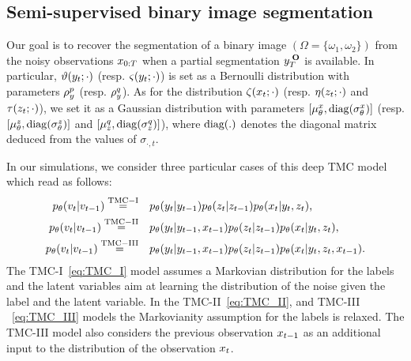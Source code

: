 \subsection{Semi-supervised binary image segmentation}
Our goal is to recover the 
segmentation of a binary image $(\Omega=\{\omega_1,\omega_2\})$
from the noisy observations
$x_{0:T}$ when a partial segmentation $y_{T}^{\;\mathbf{O}}$ is available.
In particular, $\vartheta(y_t; \cdot )$ (resp. $\varsigma(y_t;\cdot)$) 
is set  as a Bernoulli distribution with parameters $\rho_{y}^{p}$ (resp. $\rho_{y}^{q}$). 
As for the distribution  $\zeta(x_t; \cdot )$ 
(resp. $\eta(z_t;\cdot)$ and  $\tau(z_t;\cdot)$), 
we set it as a Gaussian distribution with parameters 
$[ \mu_{\theta}^{x} , \mathrm{diag}(\sigma_{\theta}^{x}) ]$ (resp.  $[ \mu_{\theta}^{z} , \mathrm{diag}(\sigma_{\theta}^{z})]$
 and $[ \mu_{z}^{q} , \mathrm{diag}(\sigma_{z}^{q}) ]$),
where ${\rm diag(.)}$ denotes the diagonal matrix deduced from the values 
of $\sigma_{\cdot,t}$.

In our simulations, we consider three particular cases of this deep TMC model
which read as follows:
\begin{align}
    \label{eq:TMC_I}
    p_{\theta}({v}_t|{v}_{t-1}) \overset{\rm TMC-I}{=}  \quad &
    p_{\theta}(y_t|y_{t-1}) 
    p_{\theta}(z_t|z_{t-1}) 
    p_{\theta}(x_t|y_t,z_t) \text{,}\\
    \label{eq:TMC_II}
    p_{\theta}({v}_t|{v}_{t-1}) \overset{\rm  TMC-II}{=}  \quad &
    p_{\theta}(y_t|y_{t-1}, x_{t-1}) 
    p_{\theta}(z_t|z_{t-1}) 
    p_{\theta}(x_t|y_t,z_t)\text{,} \\
    \label{eq:TMC_III}
    p_{\theta}({v}_t|{v}_{t-1}) \overset{\rm TMC-III}{=}  \quad&
    p_{\theta}(y_t|y_{t-1}, x_{t-1}) 
    p_{\theta}(z_t|z_{t-1}) 
    p_{\theta}(x_t|y_t,z_t, x_{t-1})
    \text{.}
\end{align} 
The TMC-I~\eqref{eq:TMC_I} model assumes a Markovian distribution 
for the labels and the latent variables aim at 
learning the distribution of the noise given the label and 
the latent variable.
In the TMC-II~\eqref{eq:TMC_II}, and TMC-III ~\eqref{eq:TMC_III}
models the Markovianity assumption
for the labels is relaxed. The TMC-III model  also
considers the previous observation $x_{t-1}$
as an additional input to the distribution of the observation $x_t$.

